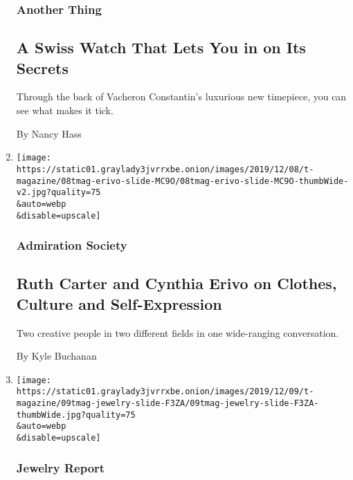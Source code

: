 \begin{enumerate}
  \hypertarget{another-thing}{%
  \subsubsection{Another Thing}\label{another-thing}}

  \hypertarget{a-swiss-watch-that-lets-you-in-on-its-secrets}{%
  \subsection{A Swiss Watch That Lets You in on Its
  Secrets}\label{a-swiss-watch-that-lets-you-in-on-its-secrets}}

  Through the back of Vacheron Constantin's luxurious new timepiece, you
  can see what makes it tick.

  By Nancy Hass
\item
  \href{/2019/12/10/t-magazine/ruth-carter-cynthia-erivo.html}{}

  \texttt{[image: https://static01.graylady3jvrrxbe.onion/images/2019/12/08/t-magazine/08tmag-erivo-slide-MC9O/08tmag-erivo-slide-MC9O-thumbWide-v2.jpg?quality=75\\\&auto=webp\\\&disable=upscale]}

  \hypertarget{admiration-society}{%
  \subsubsection{Admiration Society}\label{admiration-society}}

  \hypertarget{ruth-carter-and-cynthia-erivo-on-clothes-culture-and-self-expression}{%
  \subsection{Ruth Carter and Cynthia Erivo on Clothes, Culture and
  Self-Expression}\label{ruth-carter-and-cynthia-erivo-on-clothes-culture-and-self-expression}}

  Two creative people in two different fields in one wide-ranging
  conversation.

  By Kyle Buchanan
\item
  \href{/2019/12/09/t-magazine/colorful-jewelry.html}{}

  \texttt{[image: https://static01.graylady3jvrrxbe.onion/images/2019/12/09/t-magazine/09tmag-jewelry-slide-F3ZA/09tmag-jewelry-slide-F3ZA-thumbWide.jpg?quality=75\\\&auto=webp\\\&disable=upscale]}

  \hypertarget{jewelry-report}{%
  \subsubsection{Jewelry Report}\label{jewelry-report}}


\end{enumerate}
